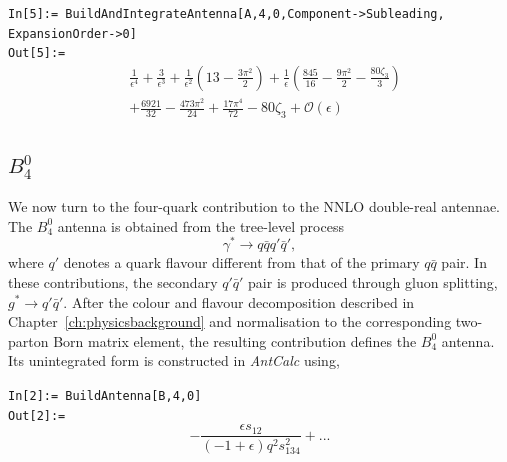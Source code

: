 \begin{mdframed}[backgroundcolor=gray!10, linewidth=0pt]
\texttt{In[5]:= BuildAndIntegrateAntenna[A,4,0,Component->Subleading,\\ExpansionOrder->0]}\\
\hfill
\texttt{Out[5]:=}
    \begin{equation*}
        \begin{split}
            &\frac1{\epsilon^4}+\frac3{\epsilon^3}+\frac1{\epsilon^2}\!\left(13-\frac{3\pi^2}2\right)+\frac1\epsilon\!\left(\frac{845}{16}-\frac{9\pi^2}{2}-\frac{80\zeta_3}{3}\right)\\
            &+\frac{6921}{32}-\frac{473\pi^2}{24}+\frac{17\pi^4}{72}-80\zeta_3+\mathcal O(\epsilon)
        \end{split}
    \end{equation*}
\end{mdframed}

\subsection{$B_4^0$}\label{subsec:B40}

We now turn to the four-quark contribution to the NNLO double-real antennae. The $B_4^0$
antenna is obtained from the tree-level process
\begin{equation*}
    \gamma^*\rightarrow q\bar q q'\bar q',
\end{equation*}
where $q'$ denotes a quark flavour different from that of the primary $q\bar q$ pair.
In these contributions, the secondary $q'\bar q'$ pair is produced through gluon splitting,
$g^*\to q'\bar q'$. After the colour and flavour decomposition described in
Chapter~\ref{ch:physicsbackground} and normalisation to the corresponding two-parton Born
matrix element, the resulting contribution defines the $B_4^0$ antenna. Its unintegrated form is
constructed in \textit{AntCalc} using,

\begin{mdframed}[backgroundcolor=gray!10, linewidth=0pt]
\texttt{In[2]:= BuildAntenna[B,4,0]}\\
\hfill
\texttt{Out[2]:=}
    \begin{equation*}
        -\frac{\epsilon s_{12}}{(-1+\epsilon)q^2s_{134}^2}+...
    \end{equation*}
\end{mdframed}

